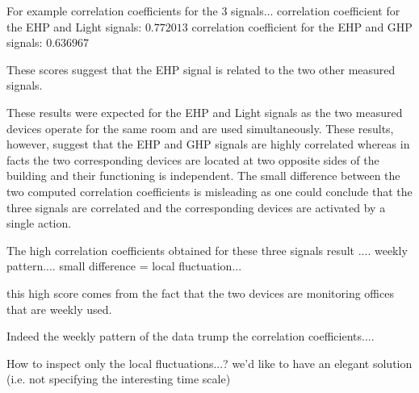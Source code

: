 For example correlation coefficients for the 3 signals...
correlation coefficient for the EHP and Light signals: $0.772013$
correlation coefficient for the EHP and GHP signals: $0.636967$

These scores suggest that the EHP signal is related to the two other measured signals.

These results were expected for the EHP and Light signals as the two measured devices operate for the same room and are used simultaneously.
These results, however, suggest that the EHP and GHP signals are highly correlated whereas in facts the two corresponding devices are located at two opposite sides of the building and their functioning is independent.
The small difference between the two computed correlation coefficients is misleading as one could conclude that the three signals are correlated and the corresponding devices are activated by a single action.

The high correlation coefficients obtained for these three signals result .... weekly pattern....
small difference = local fluctuation...

this high score comes from the fact that the two devices are monitoring offices that are weekly used.

Indeed the weekly pattern of the data trump the correlation coefficients....

How to inspect only the local fluctuations...?
we'd like to have an elegant solution (i.e. not specifying the interesting time scale)

